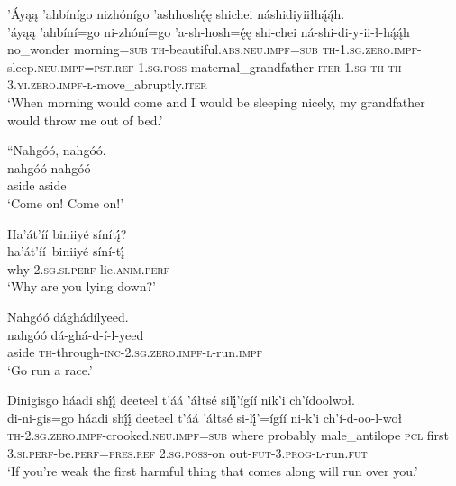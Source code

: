 \ea\label{ex:text1-5-3}
’Áyąą ’ahbínígo nizhónígo ’ashhoshę́ę shichei náshidiyiiłhą́ą́h.\\
\gll ’áyąą	’ahbíní=go	ni-zhóní=go	’a-sh-hosh=ę́ę	shi-chei	ná-shi-di-y-ii-ł-hą́ą́h\\
     no\_wonder	morning=\textsc{sub}	\textsc{th}-beautiful.\textsc{abs}.\textsc{neu}.\textsc{impf}=\textsc{sub}	\textsc{th}-1.\textsc{sg}.\textsc{zero}.\textsc{impf}-sleep.\textsc{neu}.\textsc{impf}=\textsc{pst}.\textsc{ref}	1.\textsc{sg}.\textsc{poss}-maternal\_grandfather	\textsc{iter}-1.\textsc{sg}-\textsc{th}-\textsc{th}-3.\textsc{yi}.\textsc{zero}.\textsc{impf}-\textsc{ł}-move\_abruptly.\textsc{iter}\\
\glt `When morning would come and I would be sleeping nicely, my grandfather would throw me out of bed.'
\z

\ea\label{ex:text1-6-1}
``Nahgóó, nahgóó.\\
\gll nahgóó	nahgóó\\
     aside	aside\\
\glt `Come on! Come on!'
\z

\ea\label{ex:text1-6-2}
Ha’át’íí biniiyé sínítį́?\\
\gll ha’át’íí~{biniiyé}	síní-tį́\\
     why	2.\textsc{sg}.\textsc{si}.\textsc{perf}-lie.\textsc{anim}.\textsc{perf}\\
\glt `Why are you lying down?'
\z

\ea\label{ex:text1-6-3}
Nahgóó dághádílyeed.\\
\gll nahgóó	dá-ghá-d-í-l-yeed\\
     aside	\textsc{th}-through-\textsc{inc}-2.\textsc{sg}.\textsc{zero}.\textsc{impf}-\textsc{l}-run.\textsc{impf}\\
\glt `Go run a race.'
\z

\ea\label{ex:text1-6-4}
Dinigisgo háadi shį́į́ deeteel t’áá ’áłtsé silį́’ígíí nik’i ch’ídoolwoł.\\
\gll di-ni-gis=go	háadi	shį́į́	deeteel	t’áá	’áłtsé	si-lį́’=ígíí	ni-k’i	ch’í-d-oo-l-woł\\
     \textsc{th}-2.\textsc{sg}.\textsc{zero}.\textsc{impf}-crooked.\textsc{neu}.\textsc{impf}=\textsc{sub}	where	probably	male\_antilope	\textsc{pcl}	first	3.\textsc{si}.\textsc{perf}-be.\textsc{perf}=\textsc{pres}.\textsc{ref}	2.\textsc{sg}.\textsc{poss}-on	out-\textsc{fut}-3.\textsc{prog}-\textsc{l}-run.\textsc{fut}\\
\glt `If you're weak the first harmful thing that comes along will run over you.'
\z

